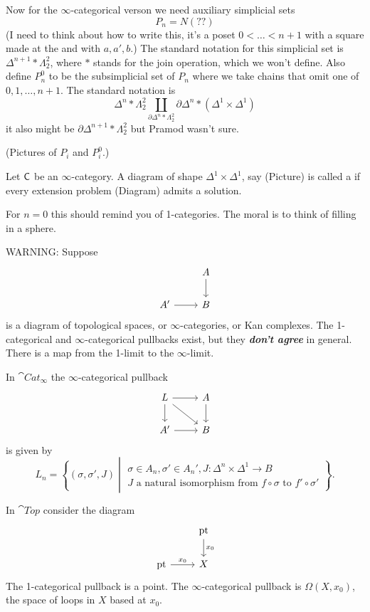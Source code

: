 Now for the $\infty$-categorical verson we need auxiliary simplicial sets
\[
	P_n = N(??)
\]
(I need to think about how to write this, it's a poset $0< \dots< n+1$ with a square made
at the and with $a,a',b$.) The standard notation for this simplicial set is
$\Delta^{n+1}*\Lambda_2^2$, where $*$ stands for the join operation, which we won't
define. Also define $P_n^{0}$ to be the subsimplicial set of $P_n$ where we take chains
that omit one of $0,1,\dots,n+1$. The standard notation is
\[
	\Delta^{n} * \Lambda^2_2 \coprod_{\partial\Delta^{n}*\Lambda_2^2}\partial\Delta^{n} *
	(\Delta^{1}\times \Delta^{1})
\]
it also might be $\partial \Delta^{n+1}*\Lambda_2^2$ but Pramod wasn't sure.

(Pictures of $P_i$ and $P_i^{0}$.)

\begin{definition}
	Let $\mathsf{C}$ be an $\infty$-category. A diagram of shape $\Delta^{1}\times \Delta^{1}$, say
	(Picture) is called a  if every extension problem (Diagram) admits a solution.
\end{definition}
For $n=0$ this should remind you of 1-categories. The moral is to think of filling in a sphere.

WARNING: Suppose
\[
	\begin{tikzcd}
		& A \ar[d] \\
		A' \ar[r] & B
	\end{tikzcd}
\]
is a diagram of topological spaces, or $\infty$-categories, or Kan complexes. The
1-categorical and $\infty$-categorical pullbacks exist, but they \textbf{\emph{don't
agree}} in general. There is a map from the 1-limit to the $\infty$-limit.

In $\cat{Cat}_\infty$ the $\infty$-categorical pullback
\[
	\begin{tikzcd}
		L \ar[r] \ar[d] \ar[dr] & A \ar[d] \\ A' \ar[r] & B
	\end{tikzcd}
\]
is given by
\[
	L_n = \left\{ (\sigma,\sigma',J) \middle|
		\begin{array}{c}
			\sigma\in A_n, \sigma'\in A_n', J:\Delta^{n}\times \Delta^{1}\to B \\
			J\text{ a natural isomorphism from }f\circ\sigma\text{ to }f'\circ\sigma'
	\end{array}\right\} .
\]

In $\cat{Top}$ consider the diagram
\[
	\begin{tikzcd}
		& \text{pt} \ar[d,"x_0"] \\
		\text{pt} \ar[r,"x_0"] & X
	\end{tikzcd}
\]
The 1-categorical pullback is a point. The $\infty$-categorical pullback is
$\Omega(X,x_0)$, the space of loops in $X$ based at $x_0$.

